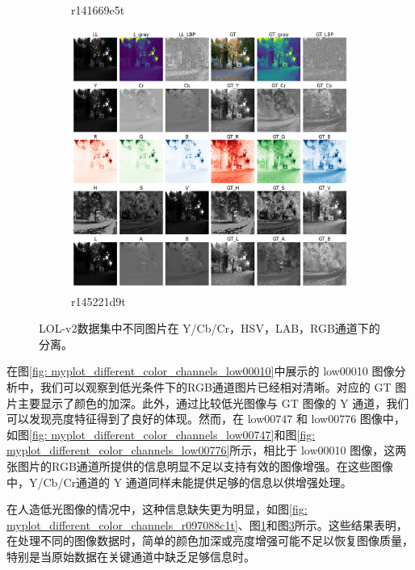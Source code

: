 \documentclass[a4paper]{ctexart}
\begin{document}
\begin{figure}[htbp]
\begin{subfigure}{0.3\textwidth}
			\captionsetup{font=scriptsize}
			\caption{r141669e5t}
			\label{fig: myplot_different_color_channels_r141669e5t}	
		\end{subfigure}
		\begin{subfigure}{0.3\textwidth}
			\includegraphics[width=\linewidth]{picture/LLIE/Experiment/myplot_different_color_channels_r145221d9t}
			\captionsetup{font=scriptsize}
			\caption{r145221d9t}
			\label{fig: myplot_different_color_channels_r145221d9t}	
		\end{subfigure}
		\caption{LOL-v2数据集中不同图片在 Y/Cb/Cr，HSV，LAB，RGB通道下的分离。 }
	\end{figure}
	
	\FloatBarrier
	
	在图\ref{fig: myplot_different_color_channels_low00010}中展示的 low00010 图像分析中，我们可以观察到低光条件下的RGB通道图片已经相对清晰。对应的 GT 图片主要显示了颜色的加深。此外，通过比较低光图像与 GT 图像的 Y 通道，我们可以发现亮度特征得到了良好的体现。然而，在 low00747 和 low00776 图像中，如图\ref{fig: myplot_different_color_channels_low00747}和图\ref{fig: myplot_different_color_channels_low00776}所示，相比于 low00010 图像，这两张图片的RGB通道所提供的信息明显不足以支持有效的图像增强。在这些图像中，Y/Cb/Cr通道的 Y 通道同样未能提供足够的信息以供增强处理。
	
	在人造低光图像的情况中，这种信息缺失更为明显，如图\ref{fig: myplot_different_color_channels_r097088c1t}、图\ref{fig: myplot_different_color_channels_r141669e5t}和图\ref{fig: myplot_different_color_channels_r145221d9t}所示。这些结果表明，在处理不同的图像数据时，简单的颜色加深或亮度增强可能不足以恢复图像质量，特别是当原始数据在关键通道中缺乏足够信息时。
	
\end{document}

